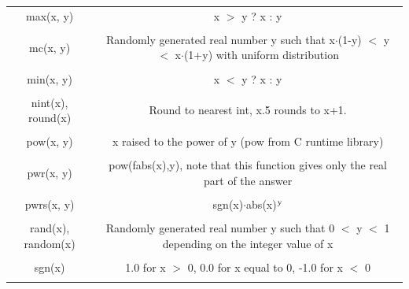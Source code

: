 \begin{longtable}{c c}
max(x, y) & \begin{minipage}{20em}
x $>$ y ? x : y
\end{minipage}\\ \\

mc(x, y) & \begin{minipage}{20em}
Randomly generated real number y such that  x$\cdot$(1-y) $<$ y $<$ x$\cdot$(1+y) with uniform distribution
\end{minipage}\\ \\

min(x, y) & \begin{minipage}{20em}
x $<$ y ? x : y
\end{minipage}\\ \\

nint(x), round(x) & \begin{minipage}{20em}
Round to nearest int, x.5 rounds to x+1.
\end{minipage}\\ \\

pow(x, y) & \begin{minipage}{20em}
x raised to the power of y (pow from C runtime library)
\end{minipage}\\ \\

pwr(x, y) & \begin{minipage}{20em}
pow(fabs(x),y), note that this function gives only the real part of the answer
\end{minipage}\\ \\

pwrs(x, y) & \begin{minipage}{20em}
sgn(x)$\cdot$abs(x)$\rm{^y}$
\end{minipage}\\ \\

rand(x), random(x) & \begin{minipage}{20em}
Randomly generated real number y such that 0 $<$ y $<$ 1 depending on the integer value of x
\end{minipage}\\ \\

sgn(x) & \begin{minipage}{20em}
1.0 for x $>$ 0, 0.0 for x equal to 0, -1.0 for x $<$ 0 
\end{minipage}\\ \\


\end{longtable}
